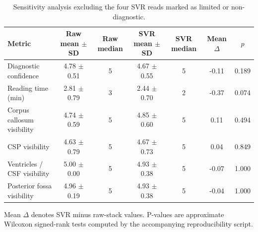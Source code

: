 \begin{table}[htbp]
\centering
\caption{Sensitivity analysis excluding the four SVR reads marked as limited or non-diagnostic.}
\label{tab:paired_metrics_clean}
\begin{threeparttable}
\begin{tabular}{lcccccc}
\toprule
Metric & Raw mean $\pm$ SD & Raw median & SVR mean $\pm$ SD & SVR median & Mean $\Delta$ & $p$ \\
\midrule
Diagnostic confidence & 4.78 $\pm$ 0.51 & 5 & 4.67 $\pm$ 0.55 & 5 & -0.11 & 0.189 \\
Reading time (min) & 2.81 $\pm$ 0.79 & 3 & 2.44 $\pm$ 0.70 & 2 & -0.37 & 0.074 \\
Corpus callosum visibility & 4.74 $\pm$ 0.59 & 5 & 4.85 $\pm$ 0.60 & 5 & 0.11 & 0.494 \\
CSP visibility & 4.63 $\pm$ 0.79 & 5 & 4.67 $\pm$ 0.73 & 5 & 0.04 & 0.849 \\
Ventricles / CSF visibility & 5.00 $\pm$ 0.00 & 5 & 4.93 $\pm$ 0.38 & 5 & -0.07 & 1.000 \\
Posterior fossa visibility & 4.96 $\pm$ 0.19 & 5 & 4.93 $\pm$ 0.38 & 5 & -0.04 & 1.000 \\
\bottomrule
\end{tabular}
\begin{tablenotes}[flushleft]
\footnotesize
\item Mean $\Delta$ denotes SVR minus raw-stack values. P-values are approximate Wilcoxon signed-rank tests computed by the accompanying reproducibility script.
\end{tablenotes}
\end{threeparttable}
\end{table}
